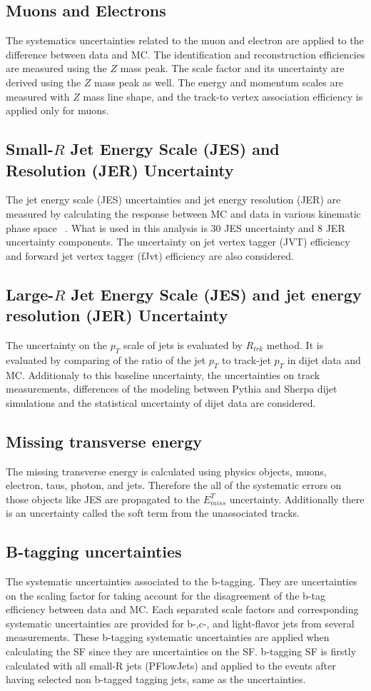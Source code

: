 \subsection{Muons and Electrons}
The systematics uncertainties related to the muon and electron are applied to the difference between data and MC. The identification and reconstruction efficiencies are measured using the $Z$ mass peak. The scale factor and its uncertainty are derived using the $Z$ mass peak as well. The energy and momentum scales are measured with $Z$ mass line shape, and the track-to vertex association efficiency is applied only for muons.
\subsection{Small-$R$ Jet Energy Scale (JES) and Resolution (JER) Uncertainty}
The jet energy scale (JES) uncertainties and jet energy resolution (JER) are measured by calculating the response between MC and data in various kinematic phase space ~\cite{JetUncertainties}.
What is used in this analysis is 30 JES uncertainty and 8 JER uncertainty components. The uncertainty on jet vertex tagger (JVT) efficiency~\cite{JVTCalib} and forward jet vertex tagger (fJvt) efficiency are also considered.
\subsection{Large-$R$ Jet Energy Scale (JES) and jet energy resolution (JER) Uncertainty}
\label{sec:fatjetUncert}
The uncertainty on the $p_T$ scale of jets is evaluated by $R_{trk}$ method. It is evaluated by comparing of the ratio of the jet $p_T$ to track-jet $p_T$ in dijet data and MC.
Additionaly to this baseline uncertainty, the uncertainties on track measurements, differences of the modeling between Pythia and Sherpa dijet simulations and the statistical uncertainty of dijet data are considered.
\subsection{Missing transverse energy}
The missing transverse energy is calculated using physics objects, muons, electron, taus, photon, and jets. Therefore the all of the systematic errors on those objects like JES are propagated to the $E^T_{miss}$ uncertainty.
Additionally there is an uncertainty called the soft term from the unassociated tracks.
\subsection{B-tagging uncertainties}
The systematic uncertainties associated to the b-tagging.
They are uncertainties on the scaling factor for taking account for the disagreement of the b-tag efficiency between data and MC. Each separated scale factors and corresponding systematic uncertainties are provided for b-,c-, and light-flavor jets from several measurements.
These b-tagging systematic uncertainties are applied when calculating the SF since they are uncertainties on the SF. b-tagging SF is firstly calculated with all small-R jets (PFlowJets) and applied to the events after having selected non b-tagged tagging jets, same as the uncertainties. 

